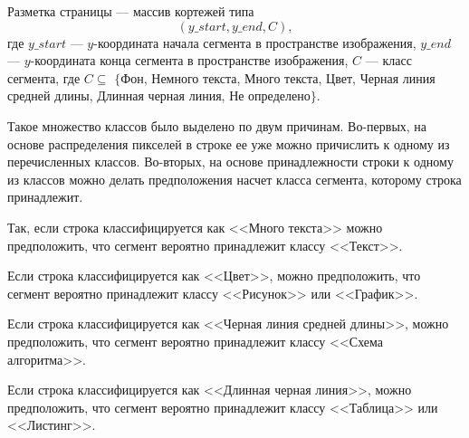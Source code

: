 Разметка страницы --- массив кортежей типа
\begin{equation}
    (y\_start, y\_end, C),
    \label{eq:y}
\end{equation}
где $y\_start$ --- $y$-координата начала сегмента в пространстве изображения, $y\_end$ --- $y$-координата конца сегмента в пространстве изображения, $C$ --- класс сегмента, где $C \subseteq$ $\{$Фон, Немного текста, Много текста, Цвет, Черная линия средней длины, Длинная черная линия, Не определено$\}$.

Такое множество классов было выделено по двум причинам.
Во-первых, на основе распределения пикселей в строке ее уже можно причислить к одному из перечисленных классов.
Во-вторых, на основе принадлежности строки к одному из классов можно делать предположения насчет класса сегмента, которому строка принадлежит.

Так, если строка классифицируется как <<Много текста>> можно предположить, что сегмент вероятно принадлежит классу <<Текст>>.

Если строка классифицируется как <<Цвет>>, можно предположить, что сегмент вероятно принадлежит классу <<Рисунок>> или <<График>>.

Если строка классифицируется как <<Черная линия средней длины>>, можно предположить, что сегмент вероятно принадлежит классу <<Схема алгоритма>>.

Если строка классифицируется как <<Длинная черная линия>>, можно предположить, что сегмент вероятно принадлежит классу <<Таблица>> или <<Листинг>>.

